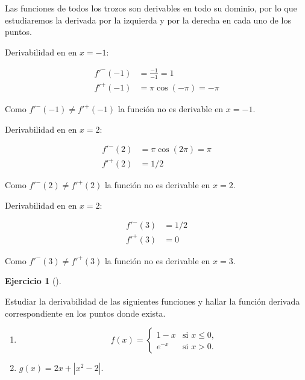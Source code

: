\documentclass[
  spanish,
  a4paper,
]{scrreport}
\theoremstyle{definition}
\newtheorem{exercise}{Ejercicio}[chapter]
\theoremstyle{remark}
\begin{document}
\begin{tcolorbox}[enhanced jigsaw, arc=.35mm, bottomrule=.15mm, bottomtitle=1mm, breakable, colback=white, colbacktitle=quarto-callout-tip-color!10!white, colframe=quarto-callout-tip-color-frame, coltitle=black, left=2mm, leftrule=.75mm, opacityback=0, opacitybacktitle=0.6, rightrule=.15mm, title=\textcolor{quarto-callout-tip-color}{\faLightbulb}\hspace{0.5em}{Solución}, titlerule=0mm, toprule=.15mm, toptitle=1mm]

Las funciones de todos los trozos son derivables en todo su dominio, por
lo que estudiaremos la derivada por la izquierda y por la derecha en
cada uno de los puntos.

Derivabilidad en en \(x=-1\):

\begin{align*}
f'^-(-1) &= \frac{-1}{-1} = 1\\
f'^+(-1) &= \pi \cos(-\pi) = -\pi
\end{align*}

Como \(f'^-(-1)\neq f'^+(-1)\) la función no es derivable en \(x=-1\).

Derivabilidad en en \(x=2\):

\begin{align*}
f'^-(2) &= \pi \cos(2\pi) = \pi\\
f'^+(2) &= 1/2
\end{align*}

Como \(f'^-(2)\neq f'^+(2)\) la función no es derivable en \(x=2\).

Derivabilidad en en \(x=2\):

\begin{align*}
f'^-(3) &= 1/2\\
f'^+(3) &= 0
\end{align*}

Como \(f'^-(3)\neq f'^+(3)\) la función no es derivable en \(x=3\).

\end{tcolorbox}

\begin{exercise}[]\protect\hypertarget{exr-derivabilidad-funcion-trozos-2}{}\label{exr-derivabilidad-funcion-trozos-2}

Estudiar la derivabilidad de las siguientes funciones y hallar la
función derivada correspondiente en los puntos donde exista.

\begin{enumerate}
\def\labelenumi{\alph{enumi}.}
\item
  \[f(x)=
  \begin{cases}
  1-x & \mbox{si $x\leq 0$,} \\
  e^{-x} & \mbox{si $x>0$.}
  \end{cases}
  \]
\item
  \(g(x)=2x+|x^2-2|\).
\end{enumerate}

\end{exercise}
\end{document}
